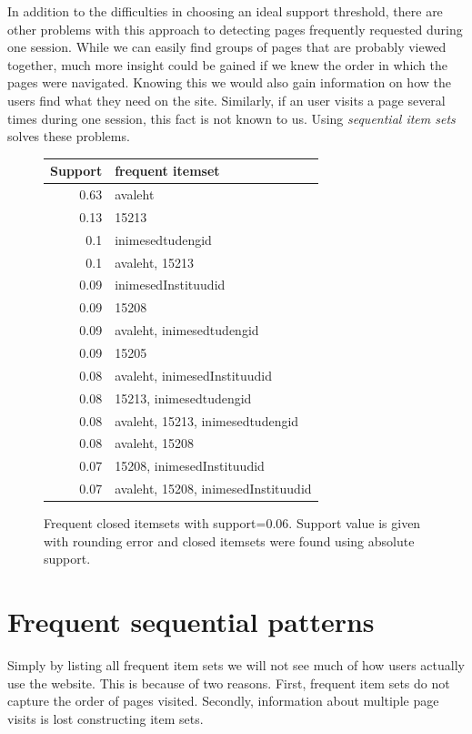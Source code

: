 \documentclass[12pt, english,a4paper]{article}
\begin{document}
In addition to the difficulties in choosing an ideal support threshold, there are other problems with this approach to detecting pages frequently requested during one session. While we can easily find groups of pages that are probably viewed together, much more insight could be gained if we knew the order in which the pages were navigated. Knowing this we would also gain information on how the users find what they need on the site. Similarly, if an user visits a page several times during one session, this fact is not known to us. Using \emph{sequential item sets} solves these problems.



\begin{figure}[H]
  \centering
\begin{tabular}{ r | l }
Support & frequent itemset \\ \hline
0.63 & avaleht \\ \hline
0.13 & 15213 \\ \hline
0.1 & inimesedtudengid \\ \hline
0.1 & avaleht, 15213 \\ \hline
0.09 & inimesedInstituudid \\ \hline
0.09 & 15208 \\ \hline
0.09 & avaleht, inimesedtudengid \\ \hline
0.09 & 15205 \\ \hline
0.08 & avaleht, inimesedInstituudid \\ \hline
0.08 & 15213, inimesedtudengid \\ \hline
0.08 & avaleht, 15213, inimesedtudengid \\ \hline
0.08 & avaleht, 15208 \\ \hline
0.07 & 15208, inimesedInstituudid \\ \hline
0.07 & avaleht, 15208, inimesedInstituudid \\ \hline
\end{tabular}
  \caption{Frequent closed itemsets with support=$0.06$. Support value is given with rounding error and closed itemsets were found using absolute support.}
  \label{frequent_patterns}
\end{figure}



\section{Frequent sequential patterns}
Simply by listing all frequent item sets we will not see much of how users actually use the website. This is because of two reasons. First, frequent item sets do not capture the order of pages visited. Secondly, information about multiple page visits is lost constructing item sets.
\end{document}
